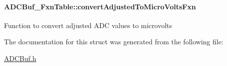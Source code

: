 \paragraph[{convert\+Adjusted\+To\+Micro\+Volts\+Fxn}]{ A\+D\+C\+Buf\+\_\+\+Fxn\+Table\+::convert\+Adjusted\+To\+Micro\+Volts\+Fxn}\label{struct_a_d_c_buf___fxn_table_a01e865f5a1ce7cbd748f05b16b87a39d}
Function to convert adjusted A\+D\+C values to microvolts 

The documentation for this struct was generated from the following file\+:\begin{DoxyCompactItemize}
\item 
\hyperlink{_a_d_c_buf_8h}{A\+D\+C\+Buf.\+h}\end{DoxyCompactItemize}
